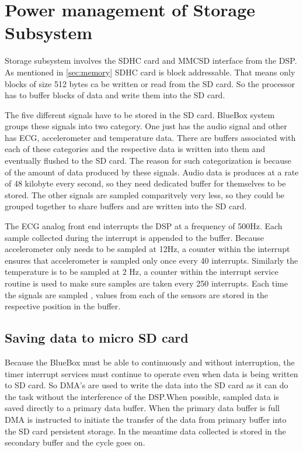 \section{Power management of Storage Subsystem}
Storage subsystem involves the SDHC card and MMCSD interface from the DSP. As mentioned in \ref{sec:memory} SDHC card is block addressable. That means only blocks of size 512 bytes ca be written or read from the SD card. So the processor has to buffer blocks of data and write them into the SD card.  

The five different signals have to be stored in the SD card. BlueBox system groups these signals into two category. One just has the audio signal and other has ECG, accelerometer and temperature data. There are buffers associated with each of these categories and the respective data is written into them and eventually flushed to the SD card. The reason for such categorization is because of the amount of data produced by these signals. Audio data is produces at a rate of 48 kilobyte every second, so they need dedicated buffer for themselves to be stored. The other signals are sampled comparitvely very less, so they could be grouped together to share buffers and are written into the SD card. 

The ECG analog front end interrupts the DSP at a frequency of 500Hz. Each sample collected during the interrupt is appended to the buffer. Because accelerometer only needs to be sampled at 12Hz, a counter within the interrupt ensures that accelerometer is sampled only once every 40 interrupts. Similarly the temperature is to be sampled at 2 Hz, a counter within the interrupt service routine is used to make sure samples are taken every 250 interrupts. Each time the signals are sampled , values from each of the sensors are stored in the respective position in the buffer. 
\subsection{Saving data to micro SD card}

Because the BlueBox must be able to continuously and without interruption, the timer interrupt services must continue to operate even when data is being written to SD card. So DMA's are used to write the data into the SD card as it can do the task without the interference of the DSP.When possible, sampled data is saved directly to a primary data buffer. When the primary data buffer is full DMA is instructed to initiate the transfer of the data from primary buffer into the SD card persistent storage. In the meantime data collected is stored in the secondary buffer and the cycle goes on. 

